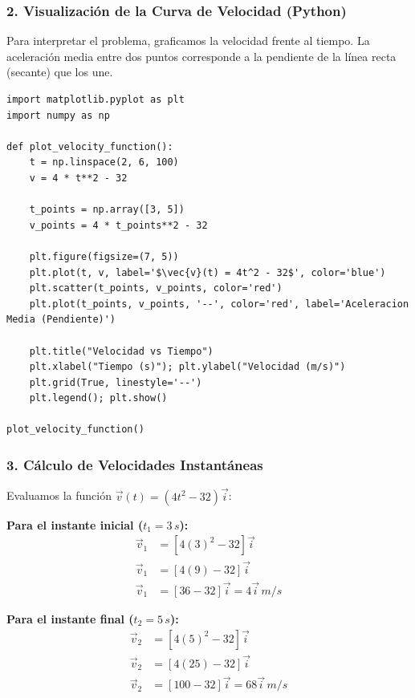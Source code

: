 \documentclass[12pt, a4paper]{article}
\begin{document}
\subsubsection*{2. Visualización de la Curva de Velocidad (Python)}

Para interpretar el problema, graficamos la velocidad frente al tiempo. La aceleración media entre dos puntos corresponde a la pendiente de la línea recta (secante) que los une.

\begin{lstlisting}
import matplotlib.pyplot as plt
import numpy as np

def plot_velocity_function():
    t = np.linspace(2, 6, 100)
    v = 4 * t**2 - 32
    
    t_points = np.array([3, 5])
    v_points = 4 * t_points**2 - 32
    
    plt.figure(figsize=(7, 5))
    plt.plot(t, v, label='$\vec{v}(t) = 4t^2 - 32$', color='blue')
    plt.scatter(t_points, v_points, color='red')
    plt.plot(t_points, v_points, '--', color='red', label='Aceleracion Media (Pendiente)')
    
    plt.title("Velocidad vs Tiempo")
    plt.xlabel("Tiempo (s)"); plt.ylabel("Velocidad (m/s)")
    plt.grid(True, linestyle='--')
    plt.legend(); plt.show()

plot_velocity_function()
\end{lstlisting}

\subsubsection*{3. Cálculo de Velocidades Instantáneas}

Evaluamos la función $\vec{v}(t) = (4t^2 - 32) \vec{i}$:

\textbf{Para el instante inicial ($t_1 = 3 \, \si{s}$):}
\begin{align*}
    \vec{v}_1 &= [4(3)^2 - 32] \vec{i} \\
    \vec{v}_1 &= [4(9) - 32] \vec{i} \\
    \vec{v}_1 &= [36 - 32] \vec{i} = 4 \vec{i} \, \si{m/s}
\end{align*}

\textbf{Para el instante final ($t_2 = 5 \, \si{s}$):}
\begin{align*}
    \vec{v}_2 &= [4(5)^2 - 32] \vec{i} \\
    \vec{v}_2 &= [4(25) - 32] \vec{i} \\
    \vec{v}_2 &= [100 - 32] \vec{i} = 68 \vec{i} \, \si{m/s}
\end{align*}
\end{document}
